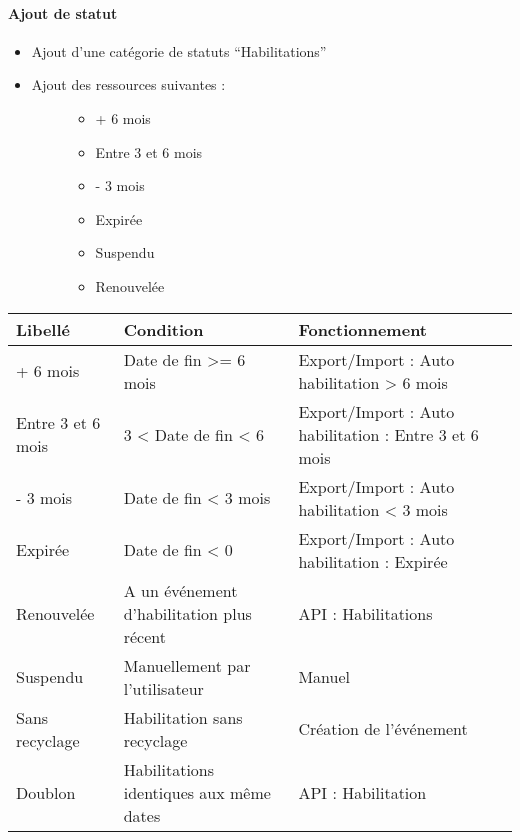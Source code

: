\documentclass[letterpaper,10pt,english]{sphinxmanual}
\begin{document}
\paragraph{Ajout de statut}
\label{\detokenize{maj/maj_30092019:ajout-de-statut}}\begin{itemize}
\item {} 
Ajout d’une catégorie de statuts “Habilitations”

\item {} \begin{description}
\item[{Ajout des ressources suivantes :}] \leavevmode\begin{itemize}
\item {} 
+ 6 mois

\item {} 
Entre 3 et 6 mois

\item {} 
- 3 mois

\item {} 
Expirée

\item {} 
Suspendu

\item {} 
Renouvelée

\end{itemize}

\end{description}

\end{itemize}


\begin{savenotes}\sphinxattablestart
\centering
\begin{tabulary}{\linewidth}[t]{|T|T|T|}
\hline
\sphinxstyletheadfamily 
Libellé
&\sphinxstyletheadfamily 
Condition
&\sphinxstyletheadfamily 
Fonctionnement
\\
\hline
+ 6 mois
&
Date de fin \textgreater{}= 6 mois
&
Export/Import : Auto habilitation \textgreater{} 6 mois
\\
\hline
Entre 3 et 6 mois
&
3 \textless{} Date de fin \textless{} 6
&
Export/Import : Auto habilitation : Entre 3 et 6 mois
\\
\hline
- 3 mois
&
Date de fin \textless{} 3 mois
&
Export/Import : Auto habilitation \textless{} 3 mois
\\
\hline
Expirée
&
Date de fin \textless{} 0
&
Export/Import : Auto habilitation : Expirée
\\
\hline
Renouvelée
&
A un événement d’habilitation plus récent
&
API : Habilitations
\\
\hline
Suspendu
&
Manuellement par l’utilisateur
&
Manuel
\\
\hline
Sans recyclage
&
Habilitation sans recyclage
&
Création de l’événement
\\
\hline
Doublon
&
Habilitations identiques aux même dates
&
API : Habilitation
\\
\hline
\end{tabulary}
\par
\sphinxattableend\end{savenotes}
\end{document}
